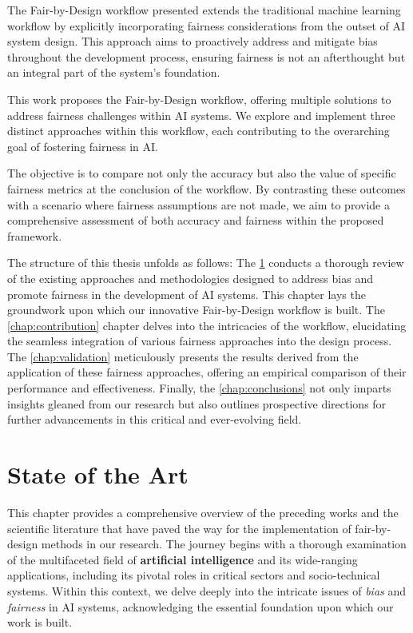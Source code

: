 \documentclass[12pt,a4paper,openright,twoside]{book}
\begin{document}
The Fair-by-Design workflow presented extends the traditional machine learning workflow by explicitly incorporating fairness considerations from the outset of AI system design. This approach aims to proactively address and mitigate bias throughout the development process, ensuring fairness is not an afterthought but an integral part of the system's foundation.

This work proposes the Fair-by-Design workflow, offering multiple solutions to address fairness challenges within AI systems. We explore and implement three distinct approaches within this workflow, each contributing to the overarching goal of fostering fairness in AI.

The objective is to compare not only the accuracy but also the value of specific fairness metrics at the conclusion of the workflow. By contrasting these outcomes with a scenario where fairness assumptions are not made, we aim to provide a comprehensive assessment of both accuracy and fairness within the proposed framework.

The structure of this thesis unfolds as follows: The \cref{chap:background} conducts a thorough review of the existing approaches and methodologies designed to address bias and promote fairness in the development of AI systems. This chapter lays the groundwork upon which our innovative Fair-by-Design workflow is built. The \cref{chap:contribution} chapter delves into the intricacies of the workflow, elucidating the seamless integration of various fairness approaches into the design process. The \cref{chap:validation} meticulously presents the results derived from the application of these fairness approaches, offering an empirical comparison of their performance and effectiveness. Finally, the \cref{chap:conclusions} not only imparts insights gleaned from our research but also outlines prospective directions for further advancements in this critical and ever-evolving field.

\chapter{State of the Art} %
\label{chap:background}

This chapter provides a comprehensive overview of the preceding works and the scientific literature that have paved the way for the implementation of fair-by-design methods in our research. The journey begins with a thorough examination of the multifaceted field of \textbf{artificial intelligence} and its wide-ranging applications, including its pivotal roles in critical sectors and socio-technical systems. Within this context, we delve deeply into the intricate issues of \emph{bias} and \emph{fairness} in AI systems, acknowledging the essential foundation upon which our work is built. 
\end{document}
